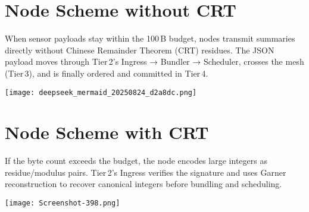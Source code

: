 \documentclass[12pt]{article}
\begin{document}
\section{Node Scheme without CRT}

When sensor payloads stay within the 100 B budget, nodes transmit summaries directly without Chinese Remainder Theorem (CRT) residues. The JSON payload moves through Tier 2's Ingress → Bundler → Scheduler, crosses the mesh (Tier 3), and is finally ordered and committed in Tier 4.


 \begin{center}
 \texttt{[image: deepseek\_mermaid\_20250824\_d2a8dc.png]}
 \end{center}

\section{Node Scheme with CRT}

If the byte count exceeds the budget, the node encodes large integers as residue/modulus pairs. Tier 2's Ingress verifies the signature and uses Garner reconstruction to recover canonical integers before bundling and scheduling.


 \begin{center}
 \texttt{[image: Screenshot-398.png]}
 \end{center}
\end{document}
